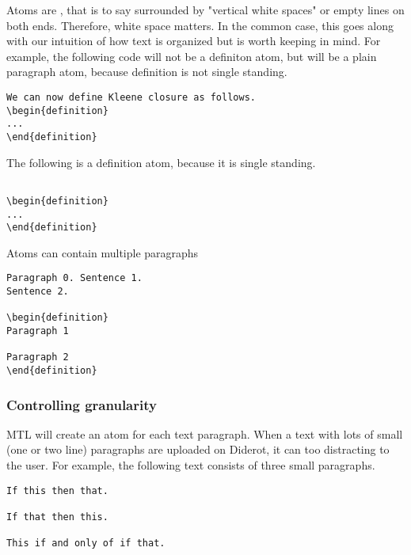 \begin{important}
Atoms are , that is to say surrounded by "vertical
white spaces" or empty lines on both ends.
%
Therefore,  white space  matters. In the common case, this goes along with our intuition of how text is organized but is worth keeping in mind. For example, the following code will not be a definiton atom, but will be a plain paragraph atom, because definition is not single standing.

\begin{lstlisting}
We can now define Kleene closure as follows.
\begin{definition}
...
\end{definition}
\end{lstlisting}

The following is a definition atom, because it is single standing.
\begin{lstlisting}

\begin{definition}
...
\end{definition}

\end{lstlisting}
\end{important}

\begin{note}
Atoms can contain multiple paragraphs


\begin{lstlisting}
Paragraph 0. Sentence 1.
Sentence 2.

\begin{definition}
Paragraph 1

Paragraph 2
\end{definition}
\end{lstlisting}
\end{note}

\subsubsection{Controlling granularity}

MTL will create an atom for each text paragraph.  When a text with lots of small (one or two line) paragraphs are uploaded on Diderot, it can too distracting to the user.  For example, the following text consists of three small paragraphs.
%
\begin{lstlisting}
If this then that.

If that then this.

This if and only of if that.
\end{lstlisting}

